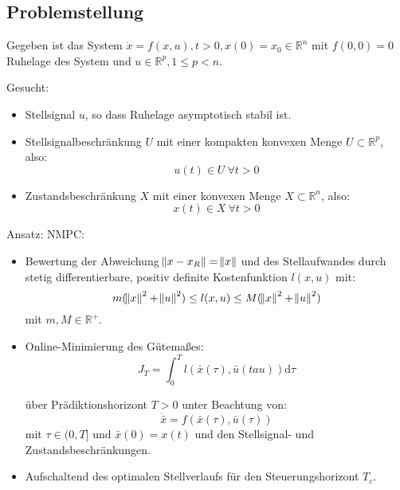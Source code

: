 \subsection{Problemstellung}
Gegeben ist das System $\dot{x} = f(x, u), t>0, x(0) = x_0 \in \mathbb{R}^n$ mit
$f(0,0)=0$ Ruhelage des System und $u \in \mathbb{R}^p, 1\leq p < n$.

Gesucht:
\begin{itemize}
    \item
        Stellsignal $u$, so dass Ruhelage asymptotisch stabil ist.
    \item
        Stellsignalbeschränkung $U$ mit einer kompakten konvexen Menge 
        $U \subset \mathbb{R}^p$, also:
        \begin{equation}
            u(t) \in U\ \forall t > 0
        \end{equation}
    \item
        Zustandsbeschränkung $X$ mit einer konvexen Menge $X \subset \mathbb{R}^n$, also:
        \begin{equation}
            x(t) \in X\ \forall t > 0
        \end{equation}
\end{itemize}

Ansatz: NMPC:
\begin{itemize}
    \item
        Bewertung der Abweichung $\norm{x-x_R} = \norm{x}$ und des Stellaufwandes durch
        stetig differentierbare, positiv definite Kostenfunktion $l(x,u)$ mit:
        \begin{equation}
            m (\norm{x}^2 + \norm{u}^2) \leq l(x,u) \leq M (\norm{x}^2 + \norm{u}^2)
        \end{equation}
        mit $m, M \in \mathbb{R}^+$.
    \item
        Online-Minimierung des Gütemaßes:
        \begin{equation}
            J_T = \int_0^T l(\bar{x}(\tau), \bar{u}(tau)) \text{d}\tau
        \end{equation}
        
        über Prädiktionshorizont $T>0$ unter Beachtung von:
        \begin{equation}    
            \dot{\bar{x}} = f(\bar{x}(\tau), \bar{u}(\tau))
        \end{equation}
        mit $\tau \in (0, T]$ und $\bar{x}(0) = x(t)$ und den Stellsignal- und
        Zustandsbeschränkungen.
    \item
        Aufschaltend des optimalen Stellverlaufs für den Steuerungshorizont $T_c$.
\end{itemize}

